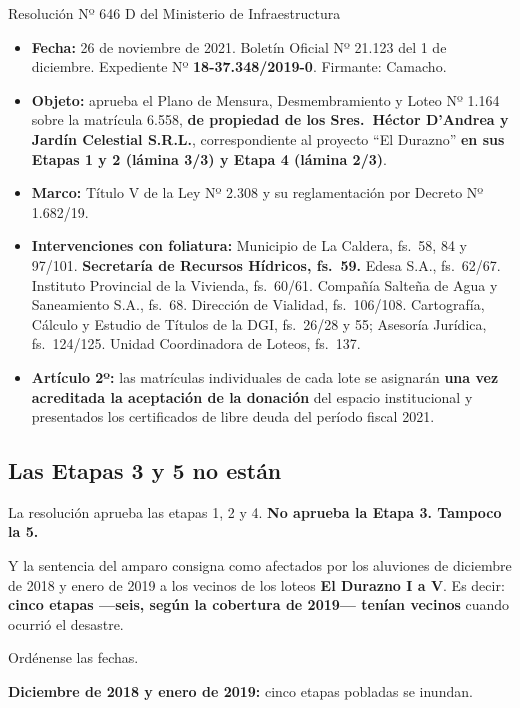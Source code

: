 \begin{ficha}{Resolución Nº 646 D del Ministerio de Infraestructura}
\begin{itemize}[leftmargin=*,nosep]
\item \textbf{Fecha:} 26 de noviembre de 2021. Boletín Oficial Nº 21.123 del 1 de diciembre. Expediente Nº \textbf{18-37.348/2019-0}. Firmante: Camacho.
\item \textbf{Objeto:} aprueba el Plano de Mensura, Desmembramiento y Loteo Nº 1.164 sobre la matrícula 6.558, \textbf{de propiedad de los Sres.\ Héctor D'Andrea y Jardín Celestial S.R.L.}, correspondiente al proyecto ``El Durazno'' \textbf{en sus Etapas 1 y 2 (lámina 3/3) y Etapa 4 (lámina 2/3)}.
\item \textbf{Marco:} Título V de la Ley Nº 2.308 y su reglamentación por Decreto Nº 1.682/19.
\item \textbf{Intervenciones con foliatura:} Municipio de La Caldera, fs.\ 58, 84 y 97/101. \textbf{Secretaría de Recursos Hídricos, fs.\ 59.} Edesa S.A., fs.\ 62/67. Instituto Provincial de la Vivienda, fs.\ 60/61. Compañía Salteña de Agua y Saneamiento S.A., fs.\ 68. Dirección de Vialidad, fs.\ 106/108. Cartografía, Cálculo y Estudio de Títulos de la DGI, fs.\ 26/28 y 55; Asesoría Jurídica, fs.\ 124/125. Unidad Coordinadora de Loteos, fs.\ 137.
\item \textbf{Artículo 2º:} las matrículas individuales de cada lote se asignarán \textbf{una vez acreditada la aceptación de la donación} del espacio institucional y presentados los certificados de libre deuda del período fiscal 2021.
\end{itemize}
\end{ficha}

\subsection*{Las Etapas 3 y 5 no están}

La resolución aprueba las etapas 1, 2 y 4. \textbf{No aprueba la Etapa 3. Tampoco la 5.}

Y la sentencia del amparo consigna como afectados por los aluviones de diciembre de 2018 y enero de 2019 a los vecinos de los loteos \textbf{El Durazno I a V}. Es decir: \textbf{cinco etapas ---seis, según la cobertura de 2019--- tenían vecinos} cuando ocurrió el desastre.

Ordénense las fechas.

\textbf{Diciembre de 2018 y enero de 2019:} cinco etapas pobladas se inundan.

